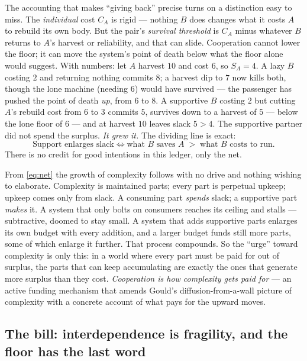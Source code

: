 \documentclass[11pt]{article}
\theoremstyle{plain}
\theoremstyle{definition}
\newcommand{\slack}{S}
\begin{document}
The accounting that makes ``giving back'' precise turns on a distinction easy to miss. The \emph{individual} cost $C_A$ is rigid --- nothing $B$ does changes what it costs $A$ to rebuild its own body. But the pair's \emph{survival threshold} is $C_A$ minus whatever $B$ returns to $A$'s harvest or reliability, and that can slide. Cooperation cannot lower the floor; it can move the system's point of death below what the floor alone would suggest. With numbers: let $A$ harvest $10$ and cost $6$, so $\slack_A = 4$. A lazy $B$ costing $2$ and returning nothing commits $8$; a harvest dip to $7$ now kills both, though the lone machine (needing $6$) would have survived --- the passenger has pushed the point of death \emph{up}, from $6$ to $8$. A supportive $B$ costing $2$ but cutting $A$'s rebuild cost from $6$ to $3$ commits $5$, survives down to a harvest of $5$ --- below the lone floor of $6$ --- and at harvest $10$ leaves slack $5 > 4$. The supportive partner did not spend the surplus. \emph{It grew it.} The dividing line is exact:
\begin{equation}
\text{Support enlarges slack} \iff \text{what } B \text{ saves } A \;>\; \text{what } B \text{ costs to run.}
\label{eq:net}
\end{equation}
There is no credit for good intentions in this ledger, only the net.

From \eqref{eq:net} the growth of complexity follows with no drive and nothing wishing to elaborate. Complexity is maintained parts; every part is perpetual upkeep; upkeep comes only from slack. A consuming part \emph{spends} slack; a supportive part \emph{makes} it. A system that only bolts on consumers reaches its ceiling and stalls --- subtractive, doomed to stay small. A system that adds supportive parts enlarges its own budget with every addition, and a larger budget funds still more parts, some of which enlarge it further. That process compounds. So the ``urge'' toward complexity is only this: in a world where every part must be paid for out of surplus, the parts that can keep accumulating are exactly the ones that generate more surplus than they cost. \emph{Cooperation is how complexity gets paid for} --- an active funding mechanism that amends Gould's diffusion-from-a-wall picture of complexity \cite{gould1996} with a concrete account of what pays for the upward moves.

\subsection{The bill: interdependence is fragility, and the floor has the last word}
\label{sec:bill}
\end{document}
